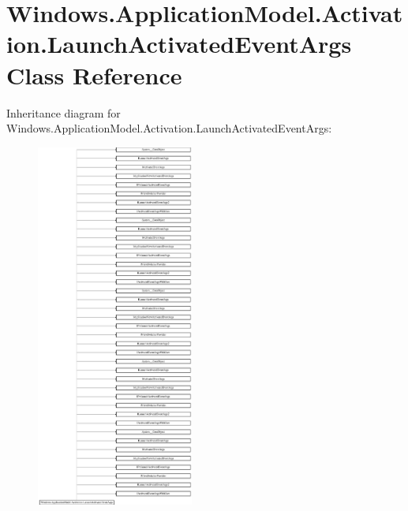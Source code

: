 \hypertarget{class_windows_1_1_application_model_1_1_activation_1_1_launch_activated_event_args}{}\section{Windows.\+Application\+Model.\+Activation.\+Launch\+Activated\+Event\+Args Class Reference}
\label{class_windows_1_1_application_model_1_1_activation_1_1_launch_activated_event_args}
Inheritance diagram for Windows.\+Application\+Model.\+Activation.\+Launch\+Activated\+Event\+Args\+:\begin{figure}[H]
\begin{center}
\leavevmode
\includegraphics[height=12.000000cm]{class_windows_1_1_application_model_1_1_activation_1_1_launch_activated_event_args}
\end{center}
\end{figure}
